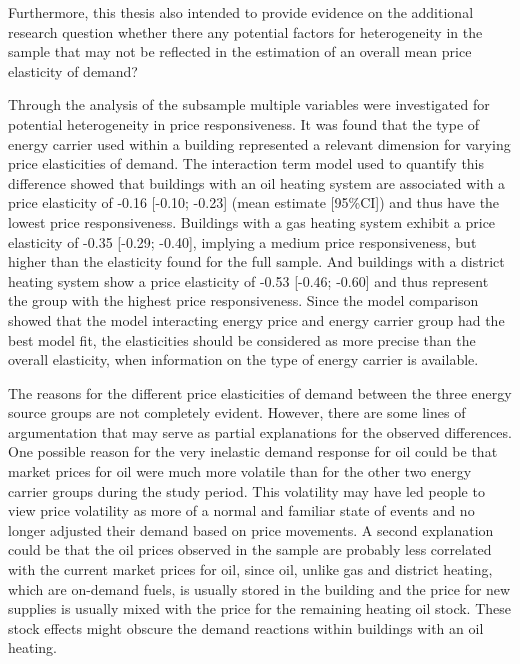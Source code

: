 \documentclass[12pt,twoside]{reedthesis}
\begin{document}
Furthermore, this thesis also intended to provide evidence on the additional research question whether there any potential factors for heterogeneity in the sample that may not be reflected in the estimation of an overall mean price elasticity of demand?

Through the analysis of the subsample multiple variables were investigated for potential heterogeneity in price responsiveness. It was found that the type of energy carrier used within a building represented a relevant dimension for varying price elasticities of demand. The interaction term model used to quantify this difference showed that buildings with an oil heating system are associated with a price elasticity of -0.16 {[}-0.10; -0.23{]} (mean estimate {[}95\%CI{]}) and thus have the lowest price responsiveness. Buildings with a gas heating system exhibit a price elasticity of -0.35 {[}-0.29; -0.40{]}, implying a medium price responsiveness, but higher than the elasticity found for the full sample. And buildings with a district heating system show a price elasticity of -0.53 {[}-0.46; -0.60{]} and thus represent the group with the highest price responsiveness. Since the model comparison showed that the model interacting energy price and energy carrier group had the best model fit, the elasticities should be considered as more precise than the overall elasticity, when information on the type of energy carrier is available.

The reasons for the different price elasticities of demand between the three energy source groups are not completely evident. However, there are some lines of argumentation that may serve as partial explanations for the observed differences. One possible reason for the very inelastic demand response for oil could be that market prices for oil were much more volatile than for the other two energy carrier groups during the study period. This volatility may have led people to view price volatility as more of a normal and familiar state of events and no longer adjusted their demand based on price movements. A second explanation could be that the oil prices observed in the sample are probably less correlated with the current market prices for oil, since oil, unlike gas and district heating, which are on-demand fuels, is usually stored in the building and the price for new supplies is usually mixed with the price for the remaining heating oil stock. These stock effects might obscure the demand reactions within buildings with an oil heating.
\end{document}
